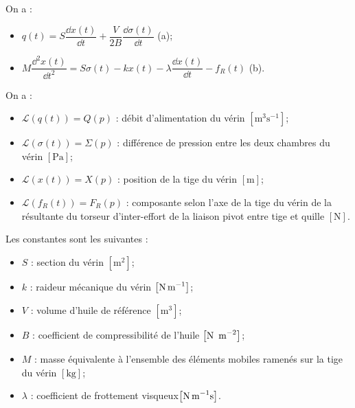 \documentclass[10pt,fleqn]{article} %
\begin{document}
\begin{multicols}{2}
\footnotesize
\begin{center}
\end{center}
\normalsize

On a : 
\begin{itemize}
\item $q(t)=S\dfrac{\dd x(t)}{ \dd t}+\dfrac{V}{2B}\dfrac{\dd \sigma(t)}{\dd t}$ (a);
\item $M\dfrac{\dd^2 x(t)}{\dd t^2} = S \sigma(t) - kx(t)-\lambda \dfrac{\dd x(t)}{\dd t} - f_R(t)$ (b).
\end{itemize}

On a :
\begin{itemize}
\item $\mathcal{L}\left(q(t)\right)=Q(p)$ : débit d’alimentation du vérin $\left[\text{m}^3\text{s}^{-1}\right]$;
\item $\mathcal{L}\left(\sigma(t)\right)=\Sigma(p)$ : différence de pression entre les deux chambres du vérin $\left[\text{Pa}\right]$;
\item $\mathcal{L}\left(x(t)\right)=X(p)$ : position de la tige du vérin $\left[\text{m}\right]$;
\item $\mathcal{L}\left(f_R(t)\right)=F_R(p)$ : composante selon l'axe de la tige du vérin de la résultante du torseur d'inter-effort de la liaison pivot entre tige et quille $\left[\text{N}\right]$.
\end{itemize}
Les constantes sont les suivantes :
\begin{itemize}
\item $S$ : section du vérin $\left[\text{m}^2\right]$;
\item $k$ : raideur mécanique du vérin $\left[\text{N\,m}^{-1}\right]$;
\item $V$ : volume d'huile de référence $\left[\text{m}^{3}\right]$;
\item $B$ : coefficient de compressibilité de l'huile $\left[\text{N\, m}^{-2}\right]$;
\item $M$ : masse équivalente à l'ensemble des éléments mobiles ramenés sur la tige du vérin $\left[\text{kg}\right]$;
\item $\lambda$ : coefficient de frottement visqueux$\left[\text{N\,m}^{-1}\text{s}\right]$.
\end{itemize} 


\end{multicols}
\end{document}
